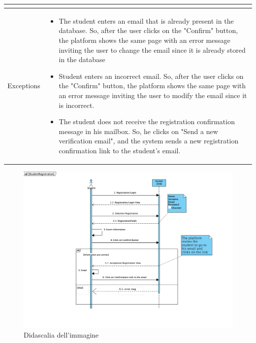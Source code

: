 \begin{longtable}{|c| p{10cm}|}
\begin{itemize}
\end{itemize}\\
\hline
Exceptions &
\begin{itemize}
\item The student enters an email that is already present in the database. So, after the user clicks on the "Confirm" button, the platform shows the same page with an error message inviting the user to change the email since it is already stored in the database
\item Student enters an incorrect email. So, after the user clicks on the "Confirm" button, the platform shows the same page with an error message inviting the user to modify the email since it is incorrect.
\item The student does not receive the registration confirmation message in his mailbox. So, he clicks on "Send a new verification email", and the system sends a new registration confirmation link to the student's email.
\end{itemize}\\
\hline
\end{longtable}

    \begin{figure}[H]
  \includegraphics[width=1\linewidth]{SequenceDiagram/StudReg.png} 
  \caption{Didascalia dell'immagine}
  \label{fig:immagine}
\end{figure}

